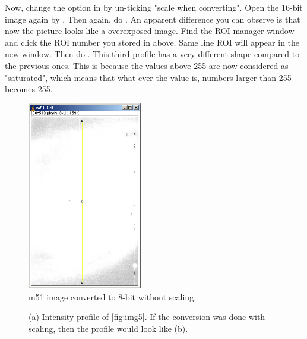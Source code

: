 \begin{indentexercise}{1}
Now, change the option in  by un-ticking "scale when
converting". Open the 16-bit image again by
. Then
again, do .
An apparent difference you can observe is that now the picture looks like a
overexposed image. Find the ROI manager window and click the ROI number
you stored in above. Same line ROI will appear in the new window. Then
do . This third profile
has a very different shape compared to the previous ones. This is because
the values above 255 are now considered as
"saturated", which means that what ever the
value is, numbers larger than 255 becomes 255.

\begin{figure}[H]
\begin{center}
\includegraphics[width=5cm]{fig/CMCIBasicCourse201102-img9.jpg}
\caption{ m51 image converted to 8-bit without scaling.}
\label{fig:img9}
\end{center}
\end{figure}

\begin{figure}[H]
\centering
{}
\caption{ (a) Intensity profile of \ref{fig:img5}. If the conversion was done with scaling, then the profile would look like (b). }
\label{fig:8bitConverted}
\end{figure} 

\end{indentexercise}

